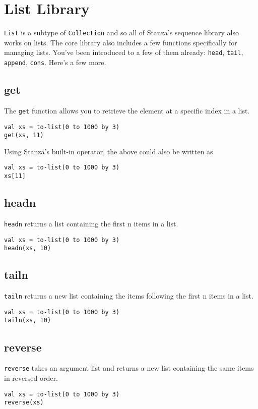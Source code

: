 \documentclass[10pt,oneside]{book}
\begin{document}
\section{List Library}
\texttt{\frenchspacing List} is a subtype of \texttt{\frenchspacing Collection} and so all of Stanza's sequence library also works on lists. The core library also includes a few functions specifically for managing lists. You've been introduced to a few of them already: \texttt{\frenchspacing head}, \texttt{\frenchspacing tail}, \texttt{\frenchspacing append}, \texttt{\frenchspacing cons}. Here's a few more.

\subsection*{get}
The \texttt{\frenchspacing get} function allows you to retrieve the element at a specific index in a list. 
\begin{lstlisting}
val xs = to-list(0 to 1000 by 3)
get(xs, 11)
\end{lstlisting}
Using Stanza's built-in operator, the above could also be written as
\begin{lstlisting}
val xs = to-list(0 to 1000 by 3)
xs[11]
\end{lstlisting}

\subsection*{headn}
\texttt{\frenchspacing headn} returns a list containing the first n items in a list.
\begin{lstlisting}
val xs = to-list(0 to 1000 by 3)
headn(xs, 10)
\end{lstlisting}

\subsection*{tailn}
\texttt{\frenchspacing tailn} returns a new list containing the items following the first n items in a list.
\begin{lstlisting}
val xs = to-list(0 to 1000 by 3)
tailn(xs, 10)
\end{lstlisting}

\subsection*{reverse}
\texttt{\frenchspacing reverse} takes an argument list and returns a new list containing the same items in reversed order.
\begin{lstlisting}
val xs = to-list(0 to 1000 by 3)
reverse(xs)
\end{lstlisting}
\end{document}

